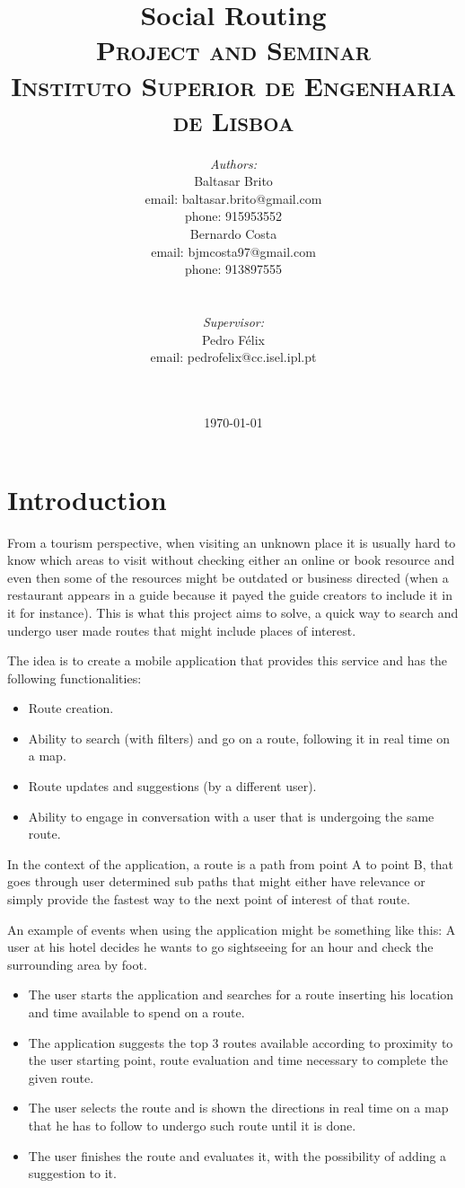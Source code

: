 \documentclass{article}
\title{\vspace{-4.0cm}
    {\Huge Social Routing}\\[0.5cm]    
    \textsc{\Large Project and Seminar}\\[0.5cm]
    \textsc{\large Instituto Superior de Engenharia de Lisboa}\\[0.5cm]
}
\date{\today}
\author{   
    \begin{minipage}{0.4\textwidth}
        \begin{flushleft} \large
        \emph{Authors:}\\
        Baltasar Brito\\
        {\small email: baltasar.brito@gmail.com}\\
        {\small phone: 915953552}\\
        Bernardo Costa\\
        {\small email: bjmcosta97@gmail.com}\\
        {\small phone: 913897555}\\
        \end{flushleft}
    \end{minipage}
    ~
    \begin{minipage}{0.4\textwidth}
        \begin{flushright} \large
        \emph{Supervisor:} \\ 
        Pedro Félix\\
        {\small email: pedrofelix@cc.isel.ipl.pt}\\  
        \end{flushright}
    \end{minipage}\\[2cm]  
}
\begin{document}
     
    
    \maketitle
 
    \section*{Introduction} 


    From a tourism perspective, when visiting an unknown place it is usually hard to know which areas to visit without 
    checking either an online or book resource and even then some of the resources might be outdated or business directed 
    (when a restaurant appears in a guide because it payed the guide creators to include it in it for instance). 
    This is what this project aims to solve, a quick way to search and undergo user made routes that might include places
    of interest.     

    The idea is to create a mobile application that provides this service and has the following functionalities:
    \begin{itemize}
        \item Route creation.
        \item Ability to search (with filters) and go on a route, following it in real time on a map.
        \item Route updates and suggestions (by a different user).
        \item Ability to engage in conversation with a user that is undergoing the same route.  
    \end{itemize}

    In the context of the application, a route is a path from point A to point B, that goes through user determined sub paths
    that might either have relevance or simply provide the fastest way to the next point of interest of that route. 

    An example of events when using the application might be something like this:
    A user at his hotel decides he wants to go sightseeing for an hour and check the surrounding area by foot.
    \begin{itemize}  
        \item The user starts the application and searches for a route inserting his location and time available to spend on a route.
        \item The application suggests the top 3 routes available according to proximity to the user starting point, route evaluation and time necessary to complete the given route. 
        \item The user selects the route and is shown the directions in real time on a map that he has to follow to undergo such route until it is done.
        \item The user finishes the route and evaluates it, with the possibility of adding a suggestion to it. 
    \end{itemize}
    
\end{document}
